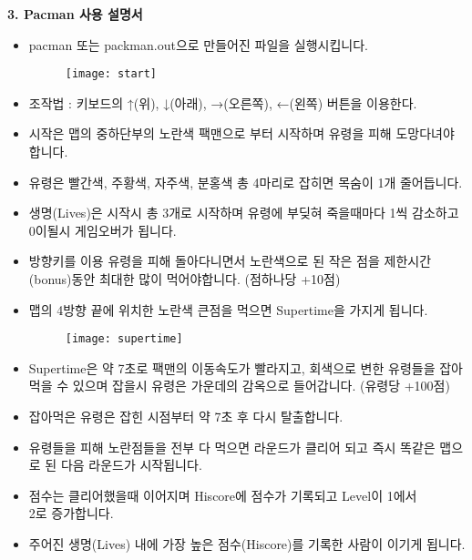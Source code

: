\documentclass{article}
\begin{document}
\newpage
\begin{large}\textbf{3. Pacman 사용 설명서}\end{large}
\begin{itemize}
\item pacman 또는 packman.out으로 만들어진 파일을 실행시킵니다.
\begin{figure}[!h]
\centering
\texttt{[image: start]}
\end{figure}
\item 조작법 : 키보드의 ↑(위), ↓(아래), →(오른쪽), ←(왼쪽) 버튼을 이용한다.
\item 시작은 맵의 중하단부의 노란색 팩맨으로 부터 시작하며 유령을 피해 도망다녀야 합니다.
\item 유령은 빨간색, 주황색, 자주색, 분홍색 총 4마리로 잡히면 목숨이 1개 줄어듭니다.
\item 생명(Lives)은 시작시 총 3개로 시작하며 유령에 부딪혀 죽을때마다 1씩 감소하고 0이될시 게임오버가 됩니다.
\item 방향키를 이용 유령을 피해 돌아다니면서 노란색으로 된 작은 점을 제한시간(bonus)동안 최대한 많이 먹어야합니다. (점하나당 +10점)
\item 맵의 4방향 끝에 위치한 노란색 큰점을 먹으면 Supertime을 가지게 됩니다.
\newpage

\begin{figure}[!h]
\centering
\texttt{[image: supertime]}
\end{figure}

\item Supertime은 약 7초로 팩맨의 이동속도가 빨라지고, 회색으로 변한 유령들을 잡아먹을 수 있으며 잡을시 유령은 가운데의 감옥으로 들어갑니다. (유령당 +100점)
\item 잡아먹은 유령은 잡힌 시점부터 약 7초 후 다시 탈출합니다.
\item 유령들을 피해 노란점들을 전부 다 먹으면 라운드가 클리어 되고 즉시 똑같은 맵으로 된 다음 라운드가 시작됩니다.
\item 점수는 클리어했을때 이어지며 Hiscore에 점수가 기록되고 Level이 1에서\\ 2로 증가합니다.
\item 주어진 생명(Lives) 내에 가장 높은 점수(Hiscore)를 기록한 사람이 이기게 됩니다.
\end{itemize}
\end{document}
